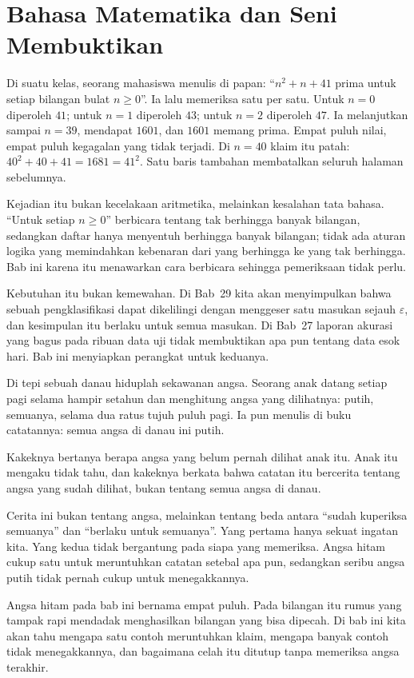 \chapter{Bahasa Matematika dan Seni Membuktikan}

Di suatu kelas, seorang mahasiswa menulis di papan: ``$n^{2}+n+41$ prima untuk setiap
bilangan bulat $n \geq 0$''. Ia lalu memeriksa satu per satu. Untuk $n=0$ diperoleh
$41$; untuk $n=1$ diperoleh $43$; untuk $n=2$ diperoleh $47$. Ia melanjutkan sampai
$n=39$, mendapat $1601$, dan $1601$ memang prima. Empat puluh nilai, empat puluh
kegagalan yang tidak terjadi. Di $n=40$ klaim itu patah:
$40^{2}+40+41 = 1681 = 41^{2}$. Satu baris tambahan membatalkan seluruh halaman
sebelumnya.

Kejadian itu bukan kecelakaan aritmetika, melainkan kesalahan tata bahasa. ``Untuk setiap
$n \geq 0$'' berbicara tentang tak berhingga banyak bilangan, sedangkan daftar hanya
menyentuh berhingga banyak bilangan; tidak ada aturan logika yang memindahkan kebenaran
dari yang berhingga ke yang tak berhingga. Bab ini karena itu menawarkan cara berbicara
sehingga pemeriksaan tidak perlu.

Kebutuhan itu bukan kemewahan. Di Bab~29 kita akan menyimpulkan bahwa sebuah
pengklasifikasi dapat dikelilingi dengan menggeser satu masukan sejauh $\varepsilon$,
dan kesimpulan itu berlaku untuk semua masukan. Di Bab~27 laporan akurasi yang bagus pada
ribuan data uji tidak membuktikan apa pun tentang data esok hari. Bab ini menyiapkan
perangkat untuk keduanya.

\begin{untukanak}
Di tepi sebuah danau hiduplah sekawanan angsa. Seorang anak datang setiap pagi selama
hampir setahun dan menghitung angsa yang dilihatnya: putih, semuanya, selama dua ratus
tujuh puluh pagi. Ia pun menulis di buku catatannya: semua angsa di danau ini putih.

Kakeknya bertanya berapa angsa yang belum pernah dilihat anak itu. Anak itu mengaku
tidak tahu, dan kakeknya berkata bahwa catatan itu bercerita tentang angsa yang sudah
dilihat, bukan tentang semua angsa di danau.

Cerita ini bukan tentang angsa, melainkan tentang beda antara ``sudah kuperiksa
semuanya'' dan ``berlaku untuk semuanya''. Yang pertama hanya sekuat ingatan kita. Yang kedua tidak bergantung pada siapa yang memeriksa. Angsa hitam
cukup satu untuk meruntuhkan catatan setebal apa pun, sedangkan seribu angsa putih
tidak pernah cukup untuk menegakkannya.

Angsa hitam pada bab ini bernama empat puluh. Pada bilangan itu rumus yang tampak rapi
mendadak menghasilkan bilangan yang bisa dipecah. Di bab ini kita akan tahu mengapa satu
contoh meruntuhkan klaim, mengapa banyak contoh tidak menegakkannya, dan bagaimana celah
itu ditutup tanpa memeriksa angsa terakhir.
\end{untukanak}


